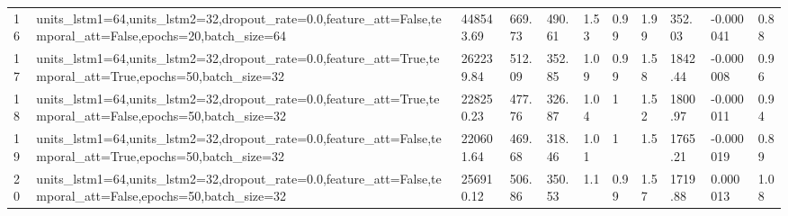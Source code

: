 \begin{longtable}{C{0.8cm} L{2cm} C{1.15cm} C{1.15cm} C{1.15cm} C{1.15cm} C{0.85cm} C{1.25cm} C{1.2cm} C{1.5cm} C{1.0cm}}
16 & units\_lstm1=64,\newline units\_lstm2=32,\newline dropout\_rate=0.0,\newline feature\_att=False,\newline temporal\_att=False,\newline epochs=20,\newline batch\_size=64 & 448543.69 & 669.73 & 490.61 & 1.53 & 0.99 & 1.99 & 352.03 & -0.000041 & 0.88 \\
17 & units\_lstm1=64,\newline units\_lstm2=32,\newline dropout\_rate=0.0,\newline feature\_att=True,\newline temporal\_att=True,\newline epochs=50,\newline batch\_size=32 & 262239.84 & 512.09 & 352.85 & 1.09 & 0.99 & 1.58 & 1842.44 & -0.000008 & 0.96 \\
18 & units\_lstm1=64,\newline units\_lstm2=32,\newline dropout\_rate=0.0,\newline feature\_att=True,\newline temporal\_att=False,\newline epochs=50,\newline batch\_size=32 & 228250.23 & 477.76 & 326.87 & 1.04 & 1 & 1.52 & 1800.97 & -0.000011 & 0.94 \\
19 & units\_lstm1=64,\newline units\_lstm2=32,\newline dropout\_rate=0.0,\newline feature\_att=False,\newline temporal\_att=True,\newline epochs=50,\newline batch\_size=32 & 220601.64 & 469.68 & 318.46 & 1.01 & 1 & 1.5 & 1765.21 & -0.000019 & 0.89 \\
20 & units\_lstm1=64,\newline units\_lstm2=32,\newline dropout\_rate=0.0,\newline feature\_att=False,\newline temporal\_att=False,\newline epochs=50,\newline batch\_size=32 & 256910.12 & 506.86 & 350.53 & 1.1 & 0.99 & 1.57 & 1719.88 & 0.000013 & 1.08 \\

\end{longtable}
